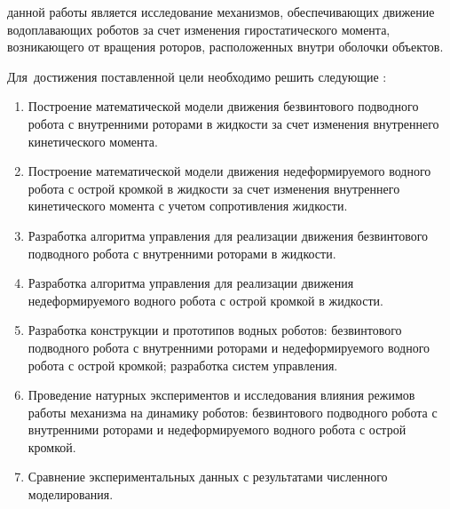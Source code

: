{\aim} данной работы является исследование механизмов, обеспечивающих движение водоплавающих роботов за счет изменения гиростатического момента, возникающего от вращения роторов, расположенных внутри оболочки объектов.

Для~достижения поставленной цели необходимо решить следующие {\tasks}:
\begin{enumerate}
  \item Построение математической модели движения безвинтового подводного робота с внутренними роторами в жидкости за счет изменения внутреннего кинетического момента.
  \item Построение математической модели движения недеформируемого водного робота с острой кромкой в жидкости за счет изменения внутреннего кинетического момента с учетом сопротивления жидкости.
  \item Разработка алгоритма управления для реализации движения безвинтового подводного робота с внутренними роторами в жидкости.
  \item Разработка алгоритма управления для реализации движения недеформируемого водного робота с острой кромкой в жидкости.
  \item Разработка конструкции и прототипов водных роботов: безвинтового подводного робота с внутренними роторами и недеформируемого водного робота с острой кромкой; разработка систем управления.
  \item Проведение натурных экспериментов и исследования влияния режимов работы механизма на динамику роботов: безвинтового подводного робота с внутренними роторами и недеформируемого водного робота с острой кромкой.
  \item Сравнение экспериментальных данных с результатами численного моделирования.
\end{enumerate}


